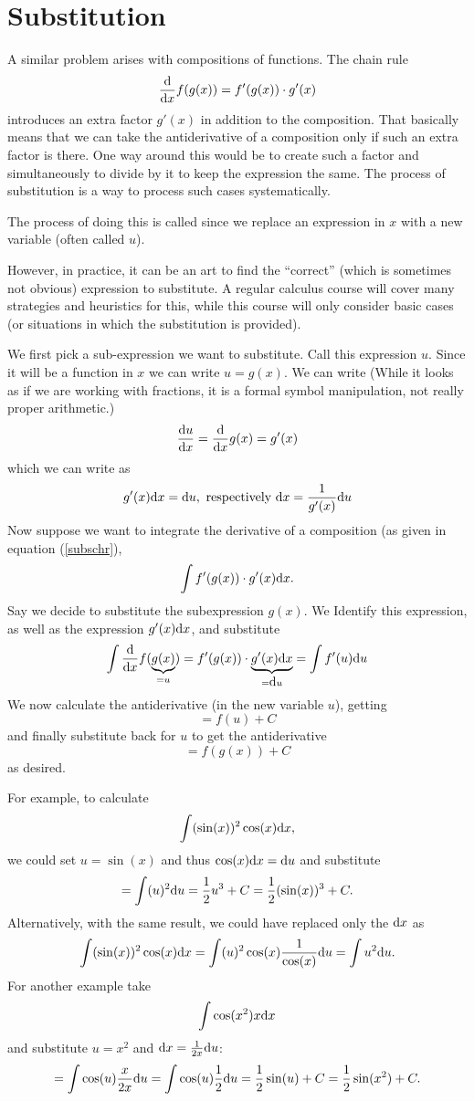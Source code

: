 \section{Substitution}

A similar problem arises with compositions of functions. The chain rule
\begin{equation}
\frac{\mbox{d}}{\mbox{d}x} f(g(x))=f'(g(x))\cdot g'(x)
\label{subschr}
\end{equation}
introduces an extra factor $g'(x)$ in addition to the composition. That
basically means that we can take the antiderivative of a composition only if
such an extra factor is there.  One way around this would be to create such
a factor and simultaneously to divide by it to keep the expression the same.
The process of substitution is a way to process such cases systematically.

The process of doing this is called  since we replace
an expression in $x$ with a new variable (often called $u$).

However, in practice, it can be an art to
find the ``correct'' (which is sometimes not obvious) expression to substitute. A
regular calculus course will cover many strategies and heuristics for this,
while this course will only consider basic cases (or situations in which the
substitution is provided).

We first pick a sub-expression we want to substitute. Call this expression
$u$. Since it will be a function in $x$ we can write $u=g(x)$. We can write
(While it looks as if we are working with fractions, it is a formal symbol
manipulation, not really proper arithmetic.)
\[
\frac{{\mbox{d}}u}{{\mbox{d}}x}=\frac{\mbox{d}}{\mbox{d}x} g(x)=g'(x)
\]
which we can write as
\[
g'(x){\mbox{d}}x={\mbox{d}}u,\mbox{\ respectively\ } {\mbox{d}}x=\frac{1}{g'(x)}{\mbox{d}}u
\]
Now suppose we want to integrate the derivative of a composition (as given
in equation (\ref{subschr}),
\[
\int f'(g(x))\cdot g'(x){\mbox{d}}x.
\]
Say we decide to substitute the subexpression $g(x)$. We Identify this
expression, as well as the expression $g'(x){\mbox{d}}x$, and substitute
\[
\int \frac{\mbox{d}}{\mbox{d}x} f(\underbrace{g(x)}_{=u})=f'(g(x))\cdot
\underbrace{g'(x){\mbox{d}}x}_{={\mbox{d}}u}=\int f'(u){\mbox{d}}u
\]
We now calculate the antiderivative (in the new variable $u$), getting
\[
=f(u)+C
\]
and finally substitute back for $u$ to get the antiderivative
\[
=f(g(x))+C
\]
as desired.

For example, to calculate
\[
\int (\sin(x))^2\cos(x){\mbox{d}}x,
\]
we could set $u=\sin(x)$ and thus $\cos(x){\mbox{d}}x={\mbox{d}}u$ and substitute
\[
=\int (u)^2{\mbox{d}}u=\frac12 u^3+C=\frac12 (\sin(x))^3+C.
\]
Alternatively, with the same result, we could have replaced only the ${\mbox{d}}x$ as
\[
\int (\sin(x))^2\cos(x){\mbox{d}}x=\int (u)^2\cos(x)\frac{1}{\cos(x)}{\mbox{d}}u=\int
u^2{\mbox{d}}u.
\]
For another example take
\[
\int \cos(x^2)x{\mbox{d}}x
\]
and substitute $u=x^2$ and ${\mbox{d}}x=\frac{1}{2x}{\mbox{d}}u$:
\[
=\int \cos(u)\frac{x}{2x}{\mbox{d}}u
=\int \cos(u)\frac{1}{2}{\mbox{d}}u=\frac12\sin(u)+C=\frac12\sin(x^2)+C.
\]
\smallskip

